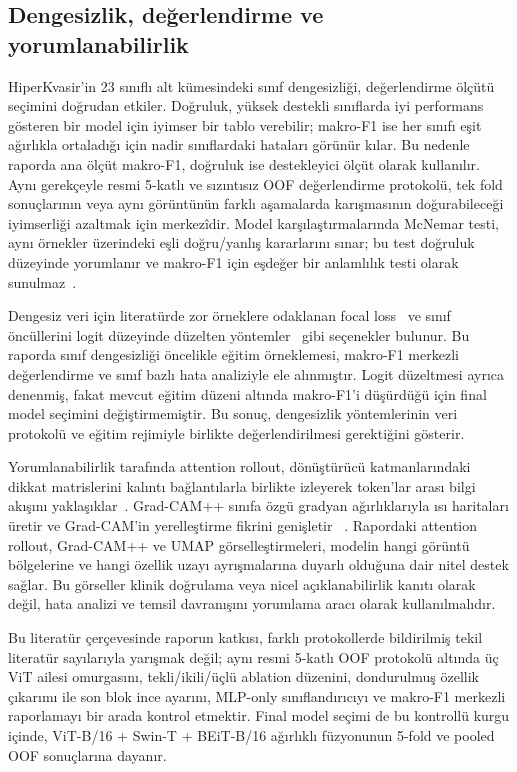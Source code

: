 \subsection{Dengesizlik, değerlendirme ve yorumlanabilirlik}

HiperKvasir'in 23 sınıflı alt kümesindeki sınıf dengesizliği, değerlendirme ölçütü
seçimini doğrudan etkiler. Doğruluk, yüksek destekli sınıflarda iyi performans gösteren
bir model için iyimser bir tablo verebilir; makro-F1 ise her sınıfı eşit ağırlıkla
ortaladığı için nadir sınıflardaki hataları görünür kılar. Bu nedenle raporda ana
ölçüt makro-F1, doğruluk ise destekleyici ölçüt olarak kullanılır. Aynı gerekçeyle
resmi 5-katlı ve sızıntısız OOF değerlendirme protokolü, tek fold sonuçlarının veya
aynı görüntünün farklı aşamalarda karışmasının doğurabileceği iyimserliği azaltmak
için merkezîdir. Model karşılaştırmalarında McNemar testi, aynı örnekler üzerindeki
eşli doğru/yanlış kararlarını sınar; bu test doğruluk düzeyinde yorumlanır ve makro-F1
için eşdeğer bir anlamlılık testi olarak sunulmaz~\cite{dietterich1998mcnemar}.

Dengesiz veri için literatürde zor örneklere odaklanan focal loss~\cite{lin2017focal}
ve sınıf öncüllerini logit düzeyinde düzelten yöntemler~\cite{menon2020logitadjust}
gibi seçenekler bulunur. Bu raporda sınıf dengesizliği öncelikle eğitim örneklemesi,
makro-F1 merkezli değerlendirme ve sınıf bazlı hata analiziyle ele alınmıştır. Logit
düzeltmesi ayrıca denenmiş, fakat mevcut eğitim düzeni altında makro-F1'i düşürdüğü
için final model seçimini değiştirmemiştir. Bu sonuç, dengesizlik yöntemlerinin veri
protokolü ve eğitim rejimiyle birlikte değerlendirilmesi gerektiğini gösterir.

Yorumlanabilirlik tarafında attention rollout, dönüştürücü katmanlarındaki dikkat
matrislerini kalıntı bağlantılarla birlikte izleyerek token'lar arası bilgi akışını
yaklaşıklar~\cite{abnar2020rollout}. Grad-CAM++ sınıfa özgü gradyan ağırlıklarıyla
ısı haritaları üretir ve Grad-CAM'in yerelleştirme fikrini genişletir
~\cite{selvaraju2017gradcam,chattopadhyay2018gradcampp}. Rapordaki attention rollout,
Grad-CAM++ ve UMAP görselleştirmeleri, modelin hangi görüntü bölgelerine ve hangi
özellik uzayı ayrışmalarına duyarlı olduğuna dair nitel destek sağlar. Bu görseller
klinik doğrulama veya nicel açıklanabilirlik kanıtı olarak değil, hata analizi ve
temsil davranışını yorumlama aracı olarak kullanılmalıdır.

Bu literatür çerçevesinde raporun katkısı, farklı protokollerde bildirilmiş tekil
literatür sayılarıyla yarışmak değil; aynı resmi 5-katlı OOF protokolü altında üç
ViT ailesi omurgasını, tekli/ikili/üçlü ablation düzenini, dondurulmuş özellik çıkarımı
ile son blok ince ayarını, MLP-only sınıflandırıcıyı ve makro-F1 merkezli raporlamayı
bir arada kontrol etmektir. Final model seçimi de bu kontrollü kurgu içinde,
ViT-B/16 + Swin-T + BEiT-B/16 ağırlıklı füzyonunun 5-fold ve pooled OOF sonuçlarına
dayanır.
